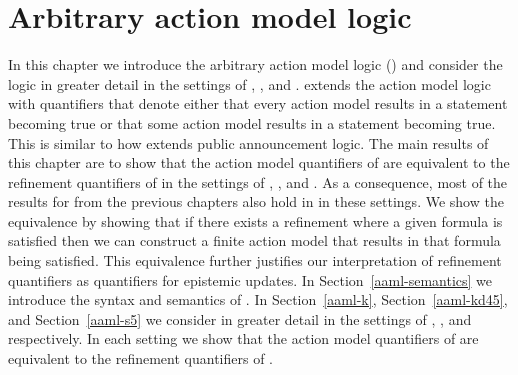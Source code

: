 \chapter{Arbitrary action model logic}\label{aaml}

In this chapter we introduce the arbitrary action model logic (\logicAaml{}) and consider the logic in greater detail in the settings of \classK{}, \classKFF{}, and \classS{}.
\logicAaml{} extends the action model logic with quantifiers that denote either that every action model results in a statement becoming true or that some action model results in a statement becoming true.
This is similar to how \logicApal{} extends public announcement logic.
The main results of this chapter are to show that the action model quantifiers of \logicAaml{} are equivalent to the refinement quantifiers of \logicRml{} in the settings of \classK{}, \classKFF{}, and \classS{}.
As a consequence, most of the results for \logicRml{} from the previous chapters also hold in \logicAaml{} in these settings.
We show the equivalence by showing that if there exists a refinement where a given formula is satisfied then we can construct a finite action model that results in that formula being satisfied.
This equivalence further justifies our interpretation of refinement quantifiers as quantifiers for epistemic updates.
In Section~\ref{aaml-semantics} we introduce the syntax and semantics of \logicAaml{}.
In Section~\ref{aaml-k}, Section~\ref{aaml-kd45}, and Section~\ref{aaml-s5} we consider \logicAaml{} in greater detail in the settings of \classK{}, \classKFF{}, and \classS{} respectively.
In each setting we show that the action model quantifiers of \logicAaml{} are equivalent to the refinement quantifiers of \logicRml{}.





